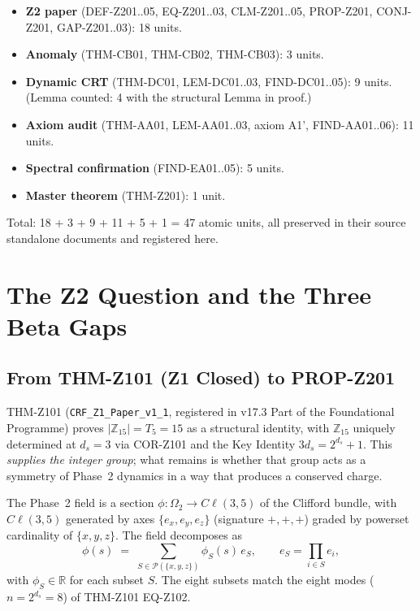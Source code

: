 \documentclass[12pt, a4paper]{article}
\begin{document}
\begin{formalbox}[title={Atomic Registry Summary --- Part XVI (47 new units in v17.4)}]
\begin{itemize}[leftmargin=*]
\item \textbf{Z2 paper} (DEF-Z201..05, EQ-Z201..03, CLM-Z201..05,
  PROP-Z201, CONJ-Z201, GAP-Z201..03): 18 units.
\item \textbf{Anomaly} (THM-CB01, THM-CB02, THM-CB03): 3 units.
\item \textbf{Dynamic CRT} (THM-DC01, LEM-DC01..03, FIND-DC01..05):
  9 units. (Lemma counted: 4 with the structural Lemma in proof.)
\item \textbf{Axiom audit} (THM-AA01, LEM-AA01..03, axiom A1',
  FIND-AA01..06): 11 units.
\item \textbf{Spectral confirmation} (FIND-EA01..05): 5 units.
\item \textbf{Master theorem} (THM-Z201): 1 unit.
\end{itemize}
Total: 18 + 3 + 9 + 11 + 5 + 1 = 47 atomic units, all preserved in
their source standalone documents and registered here.
\end{formalbox}

\section{The Z2 Question and the Three Beta Gaps}
\label{sec:Z2-question}

\subsection{From THM-Z101 (Z1 Closed) to PROP-Z201}

THM-Z101 (\texttt{CRF\_Z1\_Paper\_v1\_1}, registered in v17.3 Part of
the Foundational Programme) proves
$|\mathbb{Z}_{15}| = T_5 = 15$ as a structural identity, with
$\mathbb{Z}_{15}$ uniquely determined at $d_s = 3$ via
COR-Z101 and the Key Identity $3 d_s = 2^{d_s} + 1$. This
\emph{supplies the integer group}; what remains is whether that group
acts as a symmetry of Phase~2 dynamics in a way that produces a
conserved charge.

\begin{formalbox}[title={DEF-Z201: Phase 2 Field Representation}]
The Phase~2 field is a section $\phi: \Omega_2 \to C\!\ell(3,5)$
of the Clifford bundle, with $C\!\ell(3,5)$ generated by axes
$\{e_x, e_y, e_z\}$ (signature $+,+,+$) graded by powerset cardinality
of $\{x,y,z\}$. The field decomposes as
\begin{equation}
  \phi(s)
  \;=\;
  \sum_{S \in \mathcal{P}(\{x,y,z\})} \phi_S(s)\, e_S,
  \qquad
  e_S = \prod_{i \in S} e_i,
  \label{eq:Z201-field-rep}
\end{equation}
with $\phi_S \in \mathbb{R}$ for each subset $S$. The eight subsets
match the eight modes ($n = 2^{d_s} = 8$) of THM-Z101 EQ-Z102.
\end{formalbox}
\end{document}
